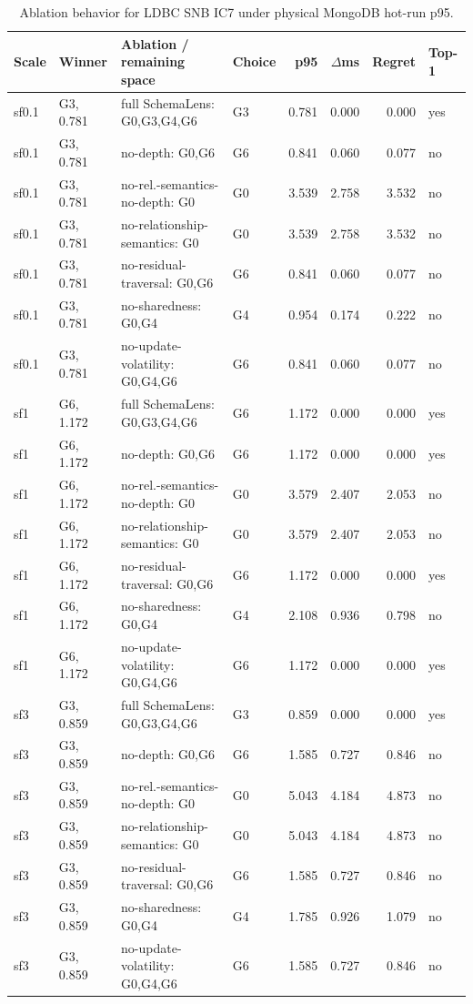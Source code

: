 \begin{table}[t]
\centering
\caption{Ablation behavior for LDBC SNB IC7 under physical MongoDB hot-run p95.}
\label{tab:ldbc-ic7-physical-ablation}
\small
\begin{tabular}{llllrrrl}
\toprule
Scale & Winner & Ablation / remaining space & Choice & p95 & $\Delta$ms & Regret & Top-1 \\
\midrule
sf0.1 & G3, 0.781 & full SchemaLens: G0,G3,G4,G6 & G3 & 0.781 & 0.000 & 0.000 & yes \\
sf0.1 & G3, 0.781 & no-depth: G0,G6 & G6 & 0.841 & 0.060 & 0.077 & no \\
sf0.1 & G3, 0.781 & no-rel.-semantics-no-depth: G0 & G0 & 3.539 & 2.758 & 3.532 & no \\
sf0.1 & G3, 0.781 & no-relationship-semantics: G0 & G0 & 3.539 & 2.758 & 3.532 & no \\
sf0.1 & G3, 0.781 & no-residual-traversal: G0,G6 & G6 & 0.841 & 0.060 & 0.077 & no \\
sf0.1 & G3, 0.781 & no-sharedness: G0,G4 & G4 & 0.954 & 0.174 & 0.222 & no \\
sf0.1 & G3, 0.781 & no-update-volatility: G0,G4,G6 & G6 & 0.841 & 0.060 & 0.077 & no \\
sf1 & G6, 1.172 & full SchemaLens: G0,G3,G4,G6 & G6 & 1.172 & 0.000 & 0.000 & yes \\
sf1 & G6, 1.172 & no-depth: G0,G6 & G6 & 1.172 & 0.000 & 0.000 & yes \\
sf1 & G6, 1.172 & no-rel.-semantics-no-depth: G0 & G0 & 3.579 & 2.407 & 2.053 & no \\
sf1 & G6, 1.172 & no-relationship-semantics: G0 & G0 & 3.579 & 2.407 & 2.053 & no \\
sf1 & G6, 1.172 & no-residual-traversal: G0,G6 & G6 & 1.172 & 0.000 & 0.000 & yes \\
sf1 & G6, 1.172 & no-sharedness: G0,G4 & G4 & 2.108 & 0.936 & 0.798 & no \\
sf1 & G6, 1.172 & no-update-volatility: G0,G4,G6 & G6 & 1.172 & 0.000 & 0.000 & yes \\
sf3 & G3, 0.859 & full SchemaLens: G0,G3,G4,G6 & G3 & 0.859 & 0.000 & 0.000 & yes \\
sf3 & G3, 0.859 & no-depth: G0,G6 & G6 & 1.585 & 0.727 & 0.846 & no \\
sf3 & G3, 0.859 & no-rel.-semantics-no-depth: G0 & G0 & 5.043 & 4.184 & 4.873 & no \\
sf3 & G3, 0.859 & no-relationship-semantics: G0 & G0 & 5.043 & 4.184 & 4.873 & no \\
sf3 & G3, 0.859 & no-residual-traversal: G0,G6 & G6 & 1.585 & 0.727 & 0.846 & no \\
sf3 & G3, 0.859 & no-sharedness: G0,G4 & G4 & 1.785 & 0.926 & 1.079 & no \\
sf3 & G3, 0.859 & no-update-volatility: G0,G4,G6 & G6 & 1.585 & 0.727 & 0.846 & no \\
\bottomrule
\end{tabular}
\end{table}